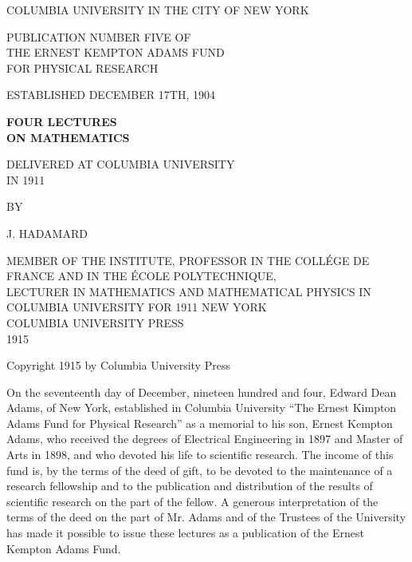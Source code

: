 \documentclass[12pt,oneside]{book}
\begin{document}
\begin{titlepage}
    \centering
    {\large COLUMBIA UNIVERSITY IN THE CITY OF NEW YORK \par}
    {\normalsize PUBLICATION NUMBER FIVE OF\\THE ERNEST KEMPTON ADAMS FUND\\FOR PHYSICAL RESEARCH\par}
    {\normalsize ESTABLISHED DECEMBER 17TH, 1904 \par}
    \vspace*{-\baselineskip}
    \noindent\makebox[\linewidth]{\rule{14cm}{0.4pt}}
    {\Huge \textbf{FOUR LECTURES\\ON MATHEMATICS} \par}
    \vspace{1cm}
    {\large DELIVERED AT COLUMBIA UNIVERSITY\\IN 1911 \par}
    \vspace{2cm}
    {\normalsize BY \par}
    \vspace*{-\baselineskip}
    {\large J. HADAMARD \par}
    \vspace{0.5cm}
    {\tiny MEMBER OF THE INSTITUTE, PROFESSOR IN THE COLL\'EGE DE FRANCE AND IN THE \'ECOLE POLYTECHNIQUE,\\
    LECTURER IN MATHEMATICS AND MATHEMATICAL PHYSICS IN COLUMBIA UNIVERSITY FOR 1911}
    \vfill
    {\large NEW YORK\\COLUMBIA UNIVERSITY PRESS\\1915}
\end{titlepage}

\begin{center}
    Copyright 1915 by Columbia University Press
\end{center}

\pagebreak

On the seventeenth day of December, nineteen hundred and four, Edward Dean Adams, of New York, established
in Columbia University ``The Ernest Kimpton Adams Fund for Physical Research'' as a memorial to his son,
Ernest Kempton Adams, who received the degrees of Electrical Engineering in 1897 and Master of Arts in 1898,
and who devoted his life to scientific research. The income of this fund is, by the terms of the deed of gift,
to be devoted to the maintenance of a research fellowship and to the publication and distribution of the
results of scientific research on the part of the fellow. A generous interpretation of the terms of the deed
on the part of Mr. Adams and of the Trustees of the University has made it possible to issue these lectures as
a publication of the Ernest Kempton Adams Fund. \par
\noindent\makebox{\rule{16.5cm}{1pt}}
\end{document}
